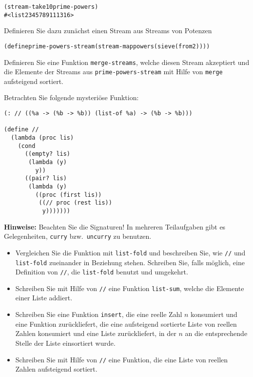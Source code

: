 \begin{aufgabe}
\begin{enumerate}
     \begin{alltt}
(stream-take 10 prime-powers)
\evalsto{} #<list 2 3 4 5 7 8 9 11 13 16>
     \end{alltt}
     Definieren Sie dazu zunächst einen Stream aus Streams von Potenzen
     \begin{alltt}
(define prime-powers-stream (stream-map powers (sieve (from 2))))
     \end{alltt}
     Definieren Sie eine Funktion \texttt{merge-streams}, welche
     diesen Stream akzeptiert und die Elemente der Streams
     aus \texttt{prime-powers-stream} mit Hilfe von \texttt{merge}
     aufsteigend sortiert.
   \end{enumerate}
 \end{aufgabe}

 \begin{aufgabe}
  Betrachten Sie folgende mysteriöse Funktion:
\begin{verbatim}
(: // ((%a -> (%b -> %b)) (list-of %a) -> (%b -> %b)))

(define //
  (lambda (proc lis)
    (cond
      ((empty? lis)
       (lambda (y)
         y))
      ((pair? lis)
       (lambda (y)
         ((proc (first lis))
          ((// proc (rest lis))
           y)))))))
\end{verbatim}
  \textbf{Hinweise:} Beachten Sie die Signaturen! In mehreren
  Teilaufgaben gibt es Gelegenheiten, \texttt{curry} bzw.\
  \texttt{uncurry} zu benutzen.

  \begin{itemize}
  \item Vergleichen Sie die Funktion mit \texttt{list-fold} und
    beschreiben Sie, wie \texttt{//} und \texttt{list-fold} zueinander
    in Beziehung stehen.  Schreiben Sie, falls möglich, eine
    Definition von \texttt{//}, die \texttt{list-fold} benutzt und
    umgekehrt.
  \item Schreiben Sie mit Hilfe von \texttt{//} eine Funktion
    \texttt{list-sum}, welche die Elemente einer Liste addiert.
  \item Schreiben Sie eine Funktion \texttt{insert}, die eine reelle
    Zahl $n$ konsumiert und eine Funktion zurückliefert, die eine
    aufsteigend sortierte Liste von reellen Zahlen konsumiert und
    eine Liste zurückliefert, in der $n$ an die entsprechende
    Stelle der Liste einsortiert wurde.
  \item Schreiben Sie mit Hilfe von \texttt{//} eine Funktion, die
    eine Liste von reellen Zahlen aufsteigend sortiert.
  \end{itemize}
\end{aufgabe}

